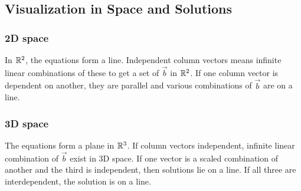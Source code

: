 \subsection{Visualization in Space and Solutions}

\subsubsection{2D space}

In $\mathbb{R}^2$, the equations form a line. Independent column vectors means infinite linear combinations of these to get
a set of $\vec{b}$ in $\mathbb{R}^2$. If one column vector is dependent on another, they are parallel and various
combinations of $\vec{b}$ are on a line.

\subsubsection{3D space}

The equations form a plane in $\mathbb{R}^3$. If column vectors independent, infinite linear combination of $\vec{b}$
exist in 3D space. If one vector is a scaled combination of another and the third is independent, then solutions lie
on a line. If all three are interdependent, the solution is on a line.
